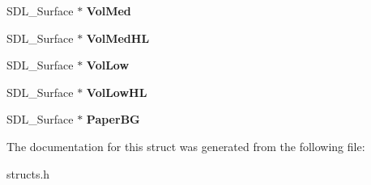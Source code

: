 \begin{DoxyCompactItemize}
S\+D\+L\+\_\+\+Surface $\ast$ {\bfseries Vol\+Med}
\item 
\mbox{\label{structSettingsmenu_a7e8be28e845fc7168ac737b3de6ce8d8}} 
S\+D\+L\+\_\+\+Surface $\ast$ {\bfseries Vol\+Med\+HL}
\item 
\mbox{\label{structSettingsmenu_a571c42300c6ee26e2bded85bbcdcb7d9}} 
S\+D\+L\+\_\+\+Surface $\ast$ {\bfseries Vol\+Low}
\item 
\mbox{\label{structSettingsmenu_a30e1e9b0ccaed19cbb377f8b32adcbcd}} 
S\+D\+L\+\_\+\+Surface $\ast$ {\bfseries Vol\+Low\+HL}
\item 
\mbox{\label{structSettingsmenu_a2cc286920a69bbce8c57df3e1b8ba1b9}} 
S\+D\+L\+\_\+\+Surface $\ast$ {\bfseries Paper\+BG}
\end{DoxyCompactItemize}


The documentation for this struct was generated from the following file\+:\begin{DoxyCompactItemize}
\item 
structs.\+h\end{DoxyCompactItemize}
